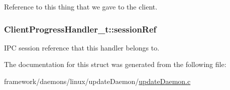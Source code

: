 Reference to this thing that we gave to the client. 

\subsubsection[{\texorpdfstring{session\+Ref}{sessionRef}}]{ Client\+Progress\+Handler\+\_\+t\+::session\+Ref}\hypertarget{struct_client_progress_handler__t_a181ce6c1d4a988342be426a5372519b2}{}\label{struct_client_progress_handler__t_a181ce6c1d4a988342be426a5372519b2}


I\+PC session reference that this handler belongs to. 



The documentation for this struct was generated from the following file\+:\begin{DoxyCompactItemize}
\item 
framework/daemons/linux/update\+Daemon/\hyperlink{update_daemon_8c}{update\+Daemon.\+c}\end{DoxyCompactItemize}
